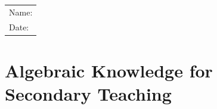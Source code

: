 \documentclass[10pt]{article}
\begin{document}
\vspace*{-0.6in}
\begin{flushright}
\begin{tabular}{|R{2in}|} \hline 
Name: \underline{\hspace*{1.5in}}  \\ 
Date: \underline{\hspace*{1.5in}} \\ \hline
\end{tabular}
\end{flushright}

\vspace*{-0.8in}
\section*{Algebraic Knowledge for Secondary Teaching}

\end{document}
